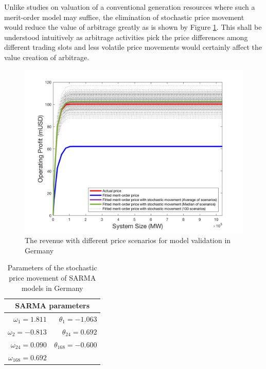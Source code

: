 Unlike studies on valuation of a conventional generation resources where such a merit-order model may suffice, the elimination of stochastic price movement would reduce the value of arbitrage greatly as is shown by Figure \ref{fig:model-validation}. This shall be understood intuitively as arbitrage activities pick the price differences among different trading slots and less volatile price movements would certainly affect the value creation of arbitrage.

\begin{figure}[h!]
	\centering
	\includegraphics[width=0.95\linewidth]{Figures/6_Model_Validation}
	\caption{The revenue with different price scenarios for model validation in Germany}
	\label{fig:model-validation}
\end{figure}

\begin{table}[h!]
	\centering
	\begin{tabular}{r r}
		\hline
		\multicolumn{2}{c}{SARMA parameters}\\
		\hline
		$\omega_1 = 1.811$ & $\theta_1 = -1.063$ \\
		$\omega_2 = -0.813$ & $\theta_{24} =0.692$ \\
		$\omega_{24} = 0.090$ & $\theta_{168} = -0.600$ \\
		$\omega_{168} = 0.692$ & \\
		\hline
	\end{tabular}
	\caption{Parameters of the stochastic price movement of SARMA models in Germany}\label{tab:SARMA}
\end{table}

